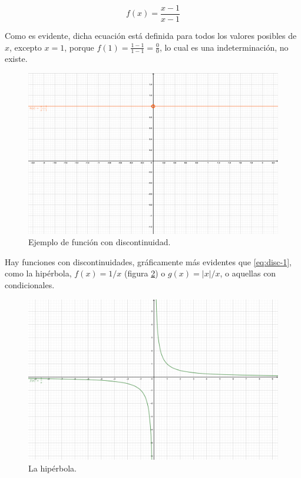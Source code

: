 \documentclass[
]{book}
\begin{document}
\begin{equation}
    f(x) = \frac{x - 1}{x - 1} \label{eq:disc-1}
\end{equation}

Como es evidente, dicha ecuación está definida para todos los valores posibles de \(x\), excepto \(x = 1\), porque \(f(1) = \frac{1 - 1}{1-1} = \frac{0}{0}\), lo cual es una indeterminación, no existe.

\begin{figure}

{\centering \includegraphics{Unidad-III/Func-discont} 

}

\caption{Ejemplo de función con discontinuidad.}\label{fig:discont}
\end{figure}

Hay funciones con discontinuidades, gráficamente más evidentes que \eqref{eq:disc-1}, como la hipérbola, \(f(x) = 1/x\) (figura \ref{fig:hiperb}) o \(g(x) = |x|/x\), o aquellas con condicionales.

\begin{figure}

{\centering \includegraphics{Unidad-III/Hiperbola} 

}

\caption{La hipérbola.}\label{fig:hiperb}
\end{figure}
\end{document}
